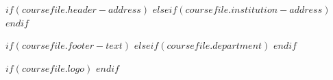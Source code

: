 $if(coursefile.header-address)$
\renewcommand{\GcetHeaderAddress}{$coursefile.header-address$}
$elseif(coursefile.institution-address)$
\renewcommand{\GcetHeaderAddress}{$coursefile.institution-address$}
$endif$

$if(coursefile.footer-text)$
\renewcommand{\GcetFooterText}{$coursefile.footer-text$}
$elseif(coursefile.department)$
\renewcommand{\GcetFooterText}{$coursefile.department$}
$endif$

$if(coursefile.logo)$
\renewcommand{\GcetHeaderLogo}{$coursefile.logo$}
$endif$

\setcounter{tocdepth}{$if(toc-depth)$$toc-depth$$else$3$endif$}
